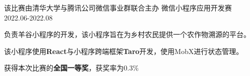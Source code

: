 
\begin{cventries}

\cventry
    {该比赛由清华大学与腾讯公司微信事业群联合主办} %
    {微信小程序应用开发赛} %
    {} %
    {2022.06-2022.08} %
    {
    \begin{cvitems} %
        \item {负责羊谷小程序的开发，该小程序旨在为乡村农民提供一个农作物溯源的平台。}
        \item {该小程序使用\textbf{React}与小程序跨端框架\textbf{Taro}开发，使用MobX进行状态管理。}
        \item {获得本次比赛的\textbf{全国一等奖}，获奖率为0.3\%}
    \end{cvitems}
    }

\end{cventries}
